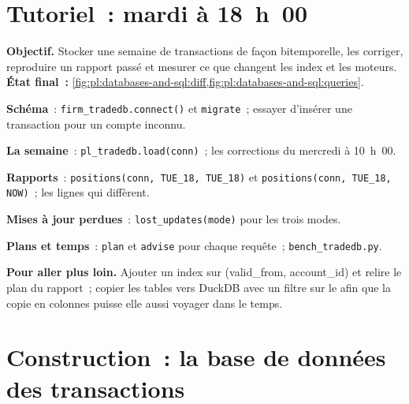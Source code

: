 \section{Tutoriel~: mardi à 18~h~00}\label{tut:pl:databases-and-sql:tut}

\begin{tutorial}
\textbf{Objectif.} Stocker une semaine de transactions de façon bitemporelle, les corriger, reproduire un rapport passé et mesurer ce que changent les index et les moteurs.
\textbf{État final~:} \cref{fig:pl:databases-and-sql:diff,fig:pl:databases-and-sql:queries}.
\begin{tutsteps}
\item \textbf{Schéma}~: \texttt{firm\_tradedb.connect()} et \texttt{migrate}~; essayer d'insérer une transaction pour un compte inconnu.
\item \textbf{La semaine}~: \texttt{pl\_tradedb.load(conn)}~; les corrections du mercredi à 10~h~00.
\item \textbf{Rapports}~: \texttt{positions(conn, TUE\_18, TUE\_18)} et \texttt{positions(conn, TUE\_18, NOW)}~; les lignes qui diffèrent.
\item \textbf{Mises à jour perdues}~: \texttt{lost\_updates(mode)} pour les trois modes.
\item \textbf{Plans et temps}~: \texttt{plan} et \texttt{advise} pour chaque requête~; \texttt{bench\_tradedb.py}.
\end{tutsteps}
\textbf{Pour aller plus loin.} Ajouter un index sur (valid\_from, account\_id) et relire le plan du rapport~; copier les tables vers DuckDB avec un
filtre sur le  afin que la copie en colonnes puisse elle aussi voyager dans le temps.
\end{tutorial}

\section{Construction~: la base de données des transactions}\label{bld:pl:databases-and-sql:tradedb}

